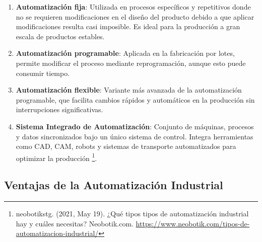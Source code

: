 \begin{enumerate}
    \item \textbf{Automatización fija}: Utilizada en procesos específicos y repetitivos donde no se requieren modificaciones en el diseño del producto debido a que aplicar modificaciones resulta casi imposible. Es ideal para la producción a gran escala de productos estables.
    \item \textbf{Automatización programable}: Aplicada en la fabricación por lotes, permite modificar el proceso mediante reprogramación, aunque esto puede consumir tiempo.
    \item \textbf{Automatización flexible}: Variante más avanzada de la automatización programable, que facilita cambios rápidos y automáticos en la producción sin interrupciones significativas.
    \item \textbf{Sistema Integrado de Automatización}: Conjunto de máquinas, procesos y datos sincronizados bajo un único sistema de control. Integra herramientas como CAD, CAM, robots y sistemas de transporte automatizados para optimizar la producción \footnote{ neobotikstg. (2021, May 19). ¿Qué tipos tipos de automatización industrial hay y cuáles necesitas? Neobotik.com. \url{ https://www.neobotik.com/tipos-de-automatizacion-industrial/}}.
\end{enumerate}

\subsection{Ventajas de la Automatización Industrial}

